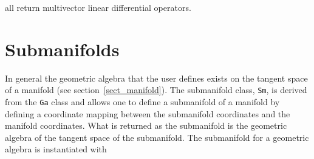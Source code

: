 \documentclass[12pt]{report}
\newcommand{\T}[1]{\texttt{#1}}
\begin{document}
all return multivector linear differential operators.

\section{Submanifolds}

In general the geometric algebra that the user defines exists on the tangent space of
a manifold (see section~\ref{sect_manifold}).  The submanifold class, \T{Sm}, is derived from
the \T{Ga} class and allows one
to define a submanifold of a manifold by defining a coordinate mapping between the submanifold
coordinates and the manifold coordinates.  What is returned as the submanifold is the geometric
algebra of the tangent space of the submanifold. The submanifold for a geometric algebra is
instantiated with
\end{document}
